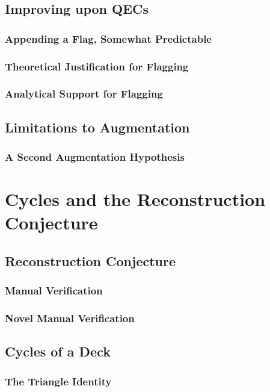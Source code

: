 \documentclass[11pt,a4paper]{report}
\begin{document}
\section{Improving upon QECs}
\subsection{Appending a Flag, Somewhat Predictable}
\subsection{Theoretical Justification for Flagging}
\subsection{Analytical Support for Flagging}

\section{Limitations to Augmentation}
\subsection{A Second Augmentation Hypothesis}


\chapter{Cycles and the Reconstruction Conjecture}

\section{Reconstruction Conjecture}

\subsection{Manual Verification}
\subsection{Novel Manual Verification}

\section{Cycles of a Deck}
\subsection{The Triangle Identity}
\end{document}
